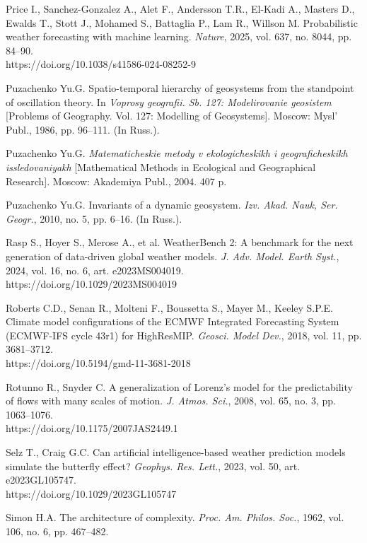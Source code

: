 \documentclass[12pt,a4paper]{article}
\begin{document}
\noindent Price I., Sanchez-Gonzalez A., Alet F., Andersson T.R., El-Kadi A., Masters D., Ewalds T., Stott J., Mohamed S., Battaglia P., Lam R., Willson M. Probabilistic weather forecasting with machine learning. \textit{Nature}, 2025, vol. 637, no. 8044, pp. 84–90.\\ https://doi.org/10.1038/s41586-024-08252-9

\noindent Puzachenko Yu.G. Spatio-temporal hierarchy of geosystems from the standpoint of oscillation theory. In \textit{Voprosy geografii. Sb. 127: Modelirovanie geosistem} [Problems of Geography. Vol. 127: Modelling of Geosystems]. Moscow: Mysl’ Publ., 1986, pp. 96–111. (In Russ.).

\noindent Puzachenko Yu.G. \textit{Matematicheskie metody v ekologicheskikh i geograficheskikh issledovaniyakh} [Mathematical Methods in Ecological and Geographical Research]. Moscow: Akademiya Publ., 2004. 407 p.

\noindent Puzachenko Yu.G. Invariants of a dynamic geosystem. \textit{Izv. Akad. Nauk, Ser. Geogr.}, 2010, no. 5, pp. 6–16. (In Russ.).

\noindent Rasp S., Hoyer S., Merose A., et al. WeatherBench 2: A benchmark for the next generation of data-driven global weather models. \textit{J. Adv. Model. Earth Syst.}, 2024, vol. 16, no. 6, art. e2023MS004019.\\ https://doi.org/10.1029/2023MS004019

\noindent Roberts C.D., Senan R., Molteni F., Boussetta S., Mayer M., Keeley S.P.E. Climate model configurations of the ECMWF Integrated Forecasting System (ECMWF-IFS cycle 43r1) for HighResMIP. \textit{Geosci. Model Dev.}, 2018, vol. 11, pp. 3681–3712.\\ https://doi.org/10.5194/gmd-11-3681-2018

\noindent Rotunno R., Snyder C. A generalization of Lorenz's model for the predictability of flows with many scales of motion. \textit{J. Atmos. Sci.}, 2008, vol. 65, no. 3, pp. 1063–1076.\\ https://doi.org/10.1175/2007JAS2449.1

\noindent Selz T., Craig G.C. Can artificial intelligence-based weather prediction models simulate the butterfly effect? \textit{Geophys. Res. Lett.}, 2023, vol. 50, art. e2023GL105747.\\ https://doi.org/10.1029/2023GL105747

\noindent Simon H.A. The architecture of complexity. \textit{Proc. Am. Philos. Soc.}, 1962, vol. 106, no. 6, pp. 467–482.
\end{document}
